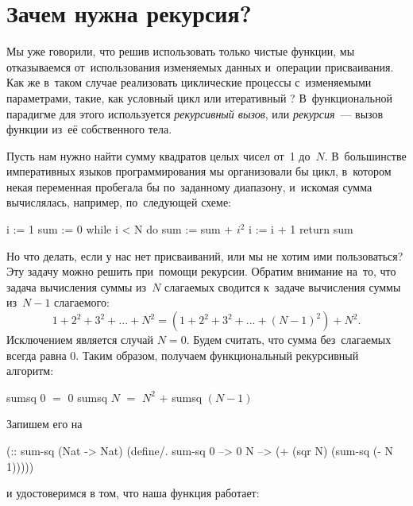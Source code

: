 \label{Less:recursion}



\section{Зачем нужна рекурсия?}%
Мы уже говорили, что решив использовать только чистые функции, мы отказываемся от~использования изменяемых данных и~операции присваивания. Как же в~таком случае реализовать циклические процессы с~изменяемыми параметрами, такие, как условный цикл  или итеративный ? В~функциональной парадигме для этого используется \emph{рекурсивный вызов}, или \emph{рекурсия}~--- вызов функции из~её собственного тела.

Пусть нам нужно найти сумму квадратов целых чисел от~1 до~$N$. В~большинстве императивных языков программирования мы организовали бы цикл, в~котором некая переменная пробегала бы по~заданному диапазону, и~искомая сумма вычислялась, например, по~следующей схеме:

\label{while}
\begin{PseudoCode}[emph={i,sum,N}]
  i := 1
  sum := 0
  while i < N do
    sum := sum + $i^2$
    i := i + 1
  return sum
\end{PseudoCode}

Но что делать, если у нас нет присваиваний, или мы не хотим ими пользоваться? Эту задачу можно решить при~помощи рекурсии. Обратим внимание на~то, что задача вычисления суммы из~$N$ слагаемых сводится к~задаче вычисления суммы из~$N-1$ слагаемого:
\begin{equation*}
1 + 2^2 + 3^2 +... + N^2 = (1 + 2^2 + 3^2 +... + (N-1)^2) + N^2.
\end{equation*}
Исключением является случай $N = 0$. Будем считать, что сумма без~слагаемых всегда равна 0. Таким образом, получаем функциональный рекурсивный алгоритм:\label{sumsq}
\begin{SchemeCode}
  sumsq $0$ $=$ $0$
  sumsq $N$ $=$ $N^2$ $+$ sumsq $(N-1)$
\end{SchemeCode}
Запишем его на~\Scheme

\begin{Definition}[emph=N]
(:: sum-sq (Nat -> Nat)
 (define/. sum-sq
   0 --> 0
   N --> (+ (sqr N) (sum-sq (- N 1)))))
\end{Definition}
и удостоверимся в том, что наша функция работает:

